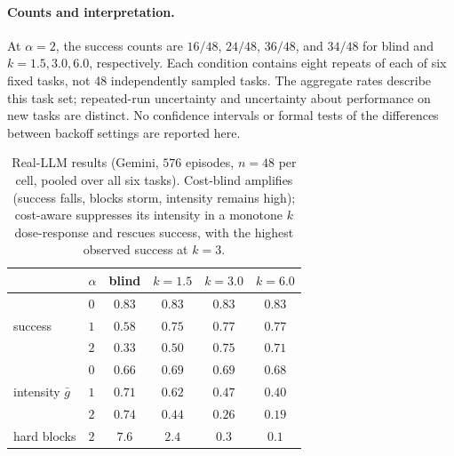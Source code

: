 \documentclass[11pt]{article}
\newcommand{\poweredEpisodes}{576}
\begin{document}
\paragraph{Counts and interpretation.}
At $\alpha=2$, the success counts are $16/48$, $24/48$, $36/48$, and $34/48$
for blind and $k=1.5,3.0,6.0$, respectively. Each condition contains eight
repeats of each of six fixed tasks, not 48 independently sampled tasks.
The aggregate rates describe this task set; repeated-run uncertainty and
uncertainty about performance on new tasks are distinct. No confidence
intervals or formal tests of the differences between backoff settings are
reported here.

\begin{table}[t]
\centering
\caption{Real-LLM results (Gemini, $\poweredEpisodes$ episodes,
$n=48$ per cell, pooled over all six tasks). Cost-blind amplifies
(success falls, blocks storm, intensity remains high); cost-aware suppresses its
intensity in a monotone $k$ dose-response and rescues success, with the highest observed
success at $k{=}3$.}
\label{tab:gemini}
\begin{tabular}{llcccc}
\toprule
 & $\alpha$ & blind & $k{=}1.5$ & $k{=}3.0$ & $k{=}6.0$ \\
\midrule
\multirow{3}{*}{success}
 & $0$ & $0.83$ & $0.83$ & $0.83$ & $0.83$ \\
 & $1$ & $0.58$ & $0.75$ & $0.77$ & $0.77$ \\
 & $2$ & $0.33$ & $0.50$ & $\mathbf{0.75}$ & $0.71$ \\
\midrule
\multirow{3}{*}{intensity $\bar g$}
 & $0$ & $0.66$ & $0.69$ & $0.69$ & $0.68$ \\
 & $1$ & $0.71$ & $0.62$ & $0.47$ & $0.40$ \\
 & $2$ & $0.74$ & $0.44$ & $0.26$ & $0.19$ \\
\midrule
hard blocks & $2$ & $7.6$ & $2.4$ & $0.3$ & $0.1$ \\
\bottomrule
\end{tabular}
\end{table}
\end{document}
